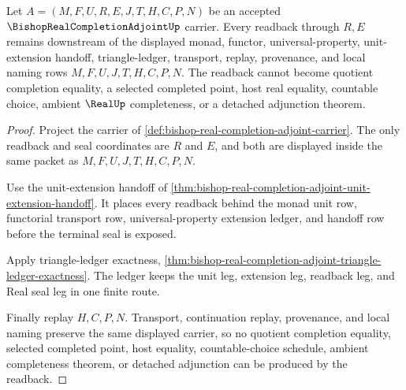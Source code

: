 \begin{theorem}
\label{thm:bishop-real-completion-adjoint-readback-nonescape}
Let $A=(M,F,U,R,E,J,T,H,C,P,N)$ be an accepted $\BishopRealCompletionAdjointUp$ carrier. Every readback through $R,E$ remains downstream of the displayed monad, functor, universal-property, unit-extension handoff, triangle-ledger, transport, replay, provenance, and local naming rows $M,F,U,J,T,H,C,P,N$. The readback cannot become quotient completion equality, a selected completed point, host real equality, countable choice, ambient $\RealUp$ completeness, or a detached adjunction theorem.
\end{theorem}
\begin{proof}
Project the carrier of \autoref{def:bishop-real-completion-adjoint-carrier}. The only readback and seal coordinates are $R$ and $E$, and both are displayed inside the same packet as $M,F,U,J,T,H,C,P,N$.

Use the unit-extension handoff of \autoref{thm:bishop-real-completion-adjoint-unit-extension-handoff}. It places every readback behind the monad unit row, functorial transport row, universal-property extension ledger, and handoff row before the terminal seal is exposed.

Apply triangle-ledger exactness, \autoref{thm:bishop-real-completion-adjoint-triangle-ledger-exactness}. The ledger keeps the unit leg, extension leg, readback leg, and Real seal leg in one finite route.

Finally replay $H,C,P,N$. Transport, continuation replay, provenance, and local naming preserve the same displayed carrier, so no quotient completion equality, selected completed point, host equality, countable-choice schedule, ambient completeness theorem, or detached adjunction can be produced by the readback.
\end{proof}


